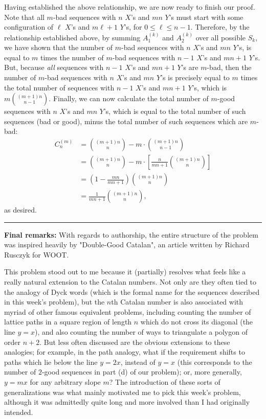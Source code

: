 \documentclass{article}
\newcommand{\V}{

\vspace{\baselineskip}

}
\begin{document}
\begin{solution}
Having established the above relationship, we are now ready to finish our proof. Note that all $m$-bad sequences with $n$ $X$'s and $mn$ $Y$'s must start with some configuration of $\ell$ $X$'s and $m\ell+1$ $Y$'s, for $0\leq \ell\leq n-1$. Therefore, by the relationship established above, by summing $A_1^{(k)}$ and $A_2^{(k)}$ over all possible $S_k$, we have shown that the number of $m$-bad sequences with $n$ $X$'s and $mn$ $Y$'s, is equal to $m$ times the number of $m$-bad sequences with $n-1$ $X$'s and $mn+1$ $Y$'s. But, because \textit{all} sequences with $n-1$ $X$'s and $mn+1$ $Y$'s are $m$-bad, then the number of $m$-bad sequences with $n$ $X$'s and $mn$ $Y$'s is precisely equal to $m$ times the total number of sequences with $n-1$ $X$'s and $mn+1$ $Y$'s, which is $m\binom{(m+1)n}{n-1}$. Finally, we can now calculate the total number of $m$-good sequences with $n$ $X$'s and $mn$ $Y$'s, which is equal to the total number of such sequences (bad or good), minus the total number of such sequences which are $m$-bad:
\begin{align*}
    C_n^{(m)} &= \binom{(m+1)n}{n} - m\cdot \binom{(m+1)n}{n-1} \\
    &= \binom{(m+1)n}{n} - m\cdot \left[\frac{n}{mn+1}\binom{(m+1)n}{n}\right]\\
    &= \left(1 - \frac{mn}{mn+1}\right)\binom{(m+1)n}{n} \\
    &= \frac{1}{mn+1}\binom{(m+1)n}{n},
\end{align*}
as desired.
\end{solution}\V

\rule{\textwidth}{0.3pt} \V


\textbf{Final remarks:} With regards to authorship, the entire structure of the problem was inspired heavily by "Double-Good Catalan", an article written by Richard Rusczyk for WOOT. \V

This problem stood out to me because it (partially) resolves what feels like a really natural extension to the Catalan numbers. Not only are they often tied to the analogy of Dyck words (which is the formal name for the sequences described in this week's problem), but the $n$th Catalan number is also associated with myriad of other famous equivalent problems, including counting the number of lattice paths in a square region of length $n$ which do not cross its diagonal (the line $y=x$), and also counting the number of ways to triangulate a polygon of order $n+2$. But less often discussed are the obvious extensions to these analogies; for example, in the path analogy, what if the requirement shifts to paths which lie below the line $y=2x$, instead of $y=x$ (this corresponds to the number of $2$-good sequences in part (d) of our problem); or, more generally, $y=mx$ for any arbitrary slope $m$? The introduction of these sorts of generalizations was what mainly motivated me to pick this week's problem, although it was admittedly quite long and more involved than I had originally intended.\V
\end{document}
